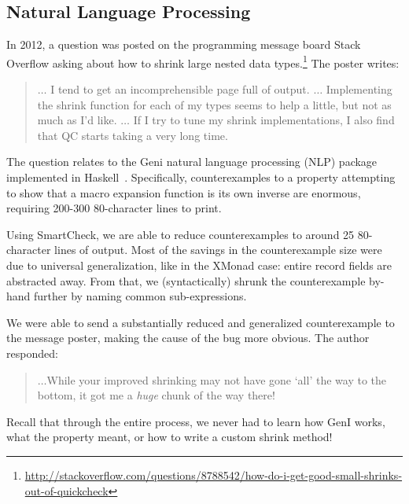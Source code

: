 \documentclass{sigplanconf}
\newcommand{\ttp}[1]{\texttt{#1}}
\begin{document}

\subsection{Natural Language Processing} \label{sec:nlp}
In 2012, a question was posted on the programming message board
Stack Overflow asking about how to shrink large nested data
types.\footnote{\url{http://stackoverflow.com/questions/8788542/how-do-i-get-good-small-shrinks-out-of-quickcheck}}
The poster writes:
\begin{quote}
$\ldots$ I tend to get an incomprehensible page full of output. $\ldots$
  Implementing the shrink function for each of my types seems to help a little,
  but not as much as I'd like.  $\ldots$ If I try to tune my shrink
  implementations, I also find that QC starts taking a very long time.
\end{quote}


\noindent
The question relates to the Geni natural language processing (NLP) package
implemented in Haskell~\cite{kow}.  Specifically, counterexamples to a property
attempting to show that a macro expansion function is its own inverse are
enormous, requiring 200-300 80-character lines to print.

Using SmartCheck, we are able to reduce counterexamples to around 25
80-character lines of output.  Most of the savings in the counterexample size
were due to universal generalization, like in the XMonad case: entire record
fields are abstracted away.  From that, we (syntactically) shrunk the
counterexample by-hand further by naming common sub-expressions.

We were able to send a substantially reduced and generalized counterexample to
the message poster, making the cause of the bug more obvious.  The author responded:
\begin{quote}
$\ldots$While your improved shrinking may not have gone `all'
the way to the bottom, it got me a \emph{huge} chunk of the way there!
\end{quote}

\noindent
Recall that through the entire process, we never had to learn how GenI works,
what the property meant, or how to write a custom shrink method!
\end{document}

